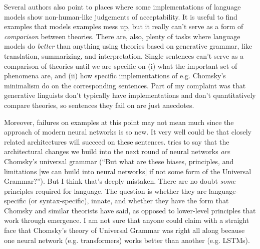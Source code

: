 \documentclass[output=paper,colorlinks,citecolor=brown
]{langscibook}
\begin{document}
Several authors also point to places where some implementations of language models show non-human-like judgements of acceptability. It is useful to find examples that models examples mess up, but it really can't serve as a form of \emph{comparison} between theories. There are, also, plenty of tasks where language models do \emph{better} than anything using theories based on generative grammar, like translation, summarizing, and interpretation. Single sentences can't serve as a comparison of theories until we are specific on (i) what the important set of phenomena are, and (ii) how specific implementations of e.g. Chomsky's minimalism do on the corresponding sentences. Part of my complaint was that generative linguists don't typically have implementations and don't quantitatively compare theories, so sentences they fail on are just anecdotes.



Moreover, failures on examples at this point may not mean much since the approach of modern neural networks is so new. It very well could be that closely related architectures will succeed on these sentences. \cite{kodner2023linguistics} tries to say that the architectural changes we build into the next round of neural networks \emph{are} Chomsky's universal grammar (``But what are these biases, principles, and limitations [we can build into neural networks] if not some form of the  Universal Grammar?''). But I think that's deeply mistaken. There are no doubt \emph{some} principles required for language. The question is whether they are language-specific (or syntax-specific), innate, and whether they have the form that Chomsky and similar theorists have said, as opposed to lower-level principles that work through emergence. I am not sure that anyone could claim with a straight face that Chomsky's theory of Universal Grammar was right all along because one neural network (e.g. transformers) works better than another (e.g. LSTMs). %


\end{document}
